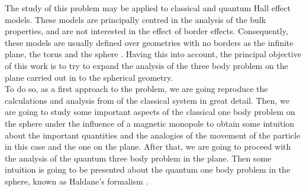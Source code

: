 The study of this problem may be applied to classical and quantum Hall effect models. These models are principally centred in the analysis of the bulk properties, and are not interested in the effect of border effects. Consequently, these models are usually defined over geometries with no borders as the infinite plane, the torus and the sphere \cite{schlief}. Having this into account, the principal objective of this work is to try to expand the analysis of the three body problem on the plane carried out in \cite{alonso} to the spherical geometry.\\

To do so, as a first approach to the problem, we are going reproduce the calculations and analysis from \cite{alonso} of the classical system in great detail. Then, we are going to study some important aspects of the classical one body problem on the sphere under the influence of a magnetic monopole to obtain some intuition about the important quantities and the analogies of the movement of the particle in this case and the one on the plane. After that, we are going to proceed with the analysis of the quantum three body problem in the plane. Then some intuition is going to be presented about the quantum one body problem in the sphere, known as Haldane's formalism \cite{haldane}.\\

